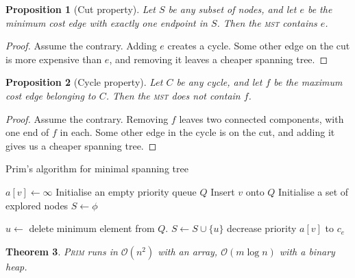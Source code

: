 \documentclass[10pt, oneside, reqno]{amsart}
\theoremstyle{plain}%
\newtheorem{thm}{Theorem}[section]
\newtheorem{prop}[thm]{Proposition}
\theoremstyle{definition}
\theoremstyle{remark}
\newcommand{\bigo}[1]{\mathcal{O}(#1)}
\begin{document}
\begin{prop}[Cut property]
    Let $S$ be any subset of nodes, and let $e$ be the minimum cost edge with exactly one endpoint in $S$.  Then the \textsc{mst} contains $e$.
\end{prop}

\begin{proof} Assume the contrary. Adding $e$ creates a cycle. Some other edge on the cut is more expensive than $e$, and removing it leaves a cheaper spanning tree.
\end{proof}

\begin{prop}[Cycle property]
    Let $C$ be any cycle, and let $f$ be the maximum cost edge belonging to $C$.  Then the \textsc{mst} does not contain $f$.
\end{prop}

\begin{proof} Assume the contrary. Removing $f$ leaves two connected components, with one end of $f$ in each. Some other edge in the cycle is on the cut, and adding it gives us a cheaper spanning tree. 
\end{proof}

\begin{algorithm}[H]
    \label{alg:dynamic_rising_trend}
    \caption{Prim's algorithm for minimal spanning tree}
    \begin{algorithmic}[1]
             $a[v] \gets \infty$ \EndFor
            \State Initialise an empty priority queue $Q$
             Insert $v$ onto $Q$ \EndFor
            \State Initialise a set of explored nodes $S \gets \phi$
            
                \State $u \gets $ delete minimum element from $Q$.
                \State $S \gets S \cup \{u \}$
                        \State decrease priority $a[v]$ to $c_e$
                    \EndIf
                
                \EndFor
            \EndWhile
    \EndProcedure
    \end{algorithmic}
\end{algorithm}

\begin{thm}
    \textsc{Prim} runs in $\bigo{n^2}$ with an array, $\bigo{m \log n}$ with a binary heap. 
\end{thm}
\end{document}

